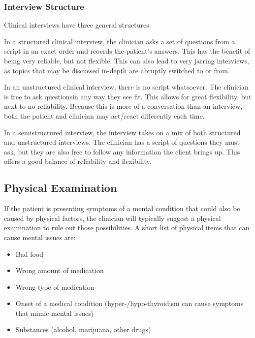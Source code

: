 \subsubsection{Interview Structure}\label{subsubsec:Interview_Structure}
Clinical interviews have three general structures:
\begin{description}[noitemsep]
\item[Structured] In a structured clinical interview, the clinician asks a set of questions from a script in an exact order and reocrds the patient's answers.
  This has the benefit of being very reliable, but not flexible.
  This can also lead to very jarring interviews, as topics that may be discussed in-depth are abruptly switched to or from.
\item[Unstructured] In an unstructured clinical interview, there is no script whatsoever.
  The clinician is free to ask questionsin any way they see fit.
  This allows for great flexibility, but next to no reliability.
  Because this is more of a conversation than an interview, both the patient and clinician may act/react differently each time.
\item[Semistructured] In a semistructured interview, the interview takes on a mix of both structured and unstructured interviews.
  The clinician has a script of questions they must ask, but they are also free to follow any information the client brings up.
  This offers a good balance of reliability and flexibility.
\end{description}

\subsection{Physical Examination}\label{subsec:Physical_Examination}
If the patient is presenting symptoms of a mental condition that could also be caused by physical factors, the clinician will typically suggest a physical examination to rule out those possibilities.
A short list of physical items that can cause mental issues are:
\begin{itemize}[noitemsep]
\item Bad food
\item Wrong amount of medication
\item Wrong type of medication
\item Onset of a medical condition (hyper-/hypo-thyroidism can cause symptoms that mimic mental issues)
\item Substances (alcohol, marijuana, other drugs)
\end{itemize}

